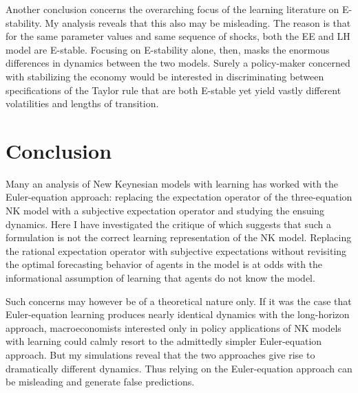 \documentclass[11pt]{article}
\renewcommand{\[}{\begin{equation}}
\renewcommand{\]}{\end{equation}}
\begin{document}
Another conclusion concerns the overarching focus of the learning literature on E-stability. My analysis reveals that this also may be misleading. The reason is that for the same parameter values and same sequence of shocks, both the EE and LH model are E-stable. Focusing on E-stability alone, then, masks the enormous differences in dynamics between the two models. Surely a policy-maker concerned with stabilizing the economy would be interested in discriminating between specifications of the Taylor rule that are both E-stable yet yield vastly different volatilities and lengths of transition. 


\clearpage
\section{Conclusion}\label{conclusion}
Many an analysis of New Keynesian models with learning has worked with the Euler-equation approach: replacing the expectation operator of the three-equation NK model with a subjective expectation operator and studying the ensuing dynamics. Here I have investigated the critique of \cite{preston2005} which suggests that such a formulation is not the correct learning representation of the NK model. Replacing the rational expectation operator with subjective expectations without revisiting the optimal forecasting behavior of agents in the model is at odds with the informational assumption of learning that agents do not know the model. 

Such concerns may however be of a theoretical nature only. If it was the case that Euler-equation learning produces nearly identical dynamics with the long-horizon approach, macroeconomists interested only in policy applications of NK models with learning could calmly resort to the admittedly simpler Euler-equation approach. But my simulations reveal that the two approaches give rise to dramatically different dynamics. Thus relying on the Euler-equation approach can be misleading and generate false predictions. 



\nocite{*}
\end{document}

